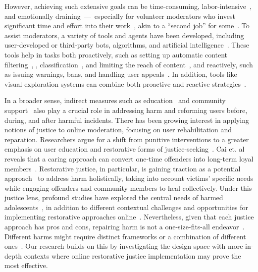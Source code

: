 However, achieving such extensive goals can be time-consuming, labor-intensive~\cite{Steiger2021}, and emotionally draining~---~especially for volunteer moderators who invest significant time and effort into their work~\cite{Wohn2019}, akin to a “second job” for some~\cite{Seering2022a}. To assist moderators, a variety of tools and agents have been developed, including user-developed or third-party bots, algorithms, and artificial intelligence~\cite{Jhaver2019, Kiene2020, Hwang2024}. These tools help in tasks both proactively, such as setting up automatic content filtering~\cite{Chandrasekharan2019}, , classification~\cite{Blackwell2017}, and limiting the reach of content~\cite{Binns2017}, and reactively, such as issuing warnings, bans, and handling user appeals~\cite{Atreja2024}. In addition, tools like visual exploration systems can combine both proactive and reactive strategies~\cite{Choi2023}.

In a broader sense, indirect measures such as education~\cite{Cai2019} and community support~\cite{Kou2024} also play a crucial role in addressing harm and reforming users before, during, and after harmful incidents. There has been growing interest in applying notions of justice to online moderation, focusing on user rehabilitation and reparation. 
Researchers argue for a shift from punitive interventions to a greater emphasis on user education and restorative forms of justice-seeking~\cite{West2018, Blackwell2018}. Cai et. al reveals that a caring approach can convert one-time offenders into long-term loyal members~\cite{Cai2021}. Restorative justice, in particular, is gaining traction as a potential approach~\cite{Kou2021} to address harm holistically, taking into account victims’ specific needs while engaging offenders and community members to heal collectively. Under this justice lens, profound studies have explored the central needs of harmed adolescents~\cite{Xiao2022}, in addition to different contextual challenges and opportunities for implementing restorative approaches online~\cite{Xiao2023}. Nevertheless, given that each justice approach has pros and cons, repairing harm is not a one-size-fits-all endeavor~\cite{Schoenebeck2021a, Warzel2019}. Different harms might require distinct frameworks or a combination of different ones~\cite{Goldman2021, Llewellyn1999}. Our research builds on this by investigating the design space with more in-depth contexts where online restorative justice implementation may prove the most effective.

